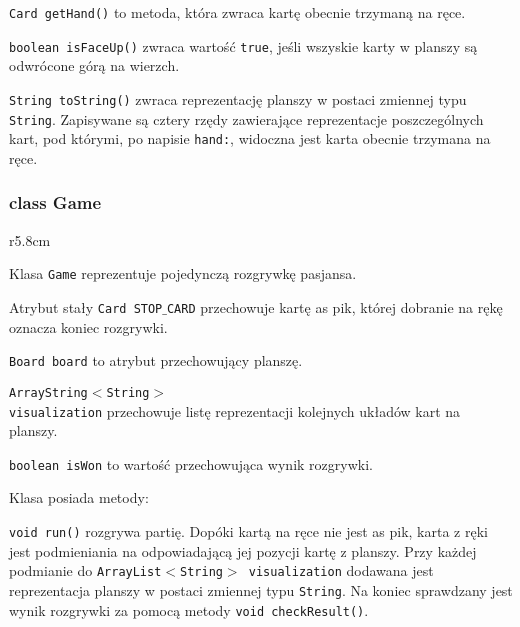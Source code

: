 \documentclass{article}
\begin{document}
\texttt{Card getHand()} to metoda, która zwraca kartę obecnie trzymaną na ręce.

\texttt{boolean isFaceUp()} zwraca wartość \texttt{true}, jeśli wszyskie karty w planszy są odwrócone górą na wierzch.

\texttt{String toString()} zwraca reprezentację planszy w postaci zmiennej typu \texttt{String}. Zapisywane są cztery rzędy zawierające reprezentacje poszczególnych kart, pod którymi, po napisie \texttt{hand:}, widoczna jest karta obecnie trzymana na ręce.

\subsubsection*{class Game}

\begin{wrapfigure}{r}{5.8cm}
\end{wrapfigure}


Klasa \texttt{Game} reprezentuje pojedynczą rozgrywkę pasjansa.

Atrybut stały \texttt{Card STOP$\_$CARD} przechowuje kartę as pik, której dobranie na rękę oznacza koniec rozgrywki.

\texttt{Board board} to atrybut przechowujący planszę.

\texttt{ArrayString$<$String$>$\\visualization} przechowuje listę reprezentacji kolejnych układów kart na planszy.

\texttt{boolean isWon} to wartość przechowująca wynik rozgrywki.

Klasa posiada metody:

\texttt{void run()} rozgrywa partię. Dopóki kartą na ręce nie jest as pik, karta z ręki jest podmieniania na odpowiadającą jej pozycji kartę z planszy. Przy każdej podmianie do \texttt{ArrayList$<$String$>$ visualization} dodawana jest reprezentacja planszy w postaci zmiennej typu \texttt{String}. Na koniec sprawdzany jest wynik rozgrywki za pomocą metody \texttt{void checkResult()}.
\end{document}
